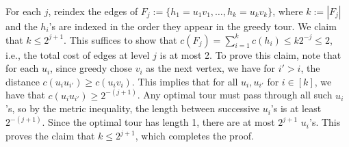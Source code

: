 \documentclass[11pt,letterpaper]{article}
\theoremstyle{definition}
\begin{document}
For each $j$, reindex the edges of $F_j := \{h_1 = u_1v_1,\dots, h_k = u_kv_k\}$, where $k:=|F_j|$ and the $h_i$'s are indexed in the order they appear in the greedy tour.
We claim that $k\leq 2^{j+1}$. This suffices to show that $c(F_j) = \sum_{i=1}^k c(h_i)\leq k 2^{-j}\leq 2$, i.e., the total cost of edges at level $j$ is at most 2.
To prove this claim, note that for each $u_i$, since greedy chose $v_i$ as the next vertex, we have for $i'>i$, the distance $c(u_iu_{i'})\geq c(u_iv_i)$.
This implies that for all $u_i, u_{i'}$ for $i\in [k]$, we have that $c(u_iu_{i'})\geq 2^{-(j+1)}$.
Any optimal tour must pass through all such $u_i$'s, so by the metric inequality, the length between successive $u_i$'s is at least $2^{-(j+1)}$.
Since the optimal tour has length 1, there are at most $2^{j+1}$ $u_i$'s.
This proves the claim that $k\leq 2^{j+1}$, which completes the proof.
\end{document}
